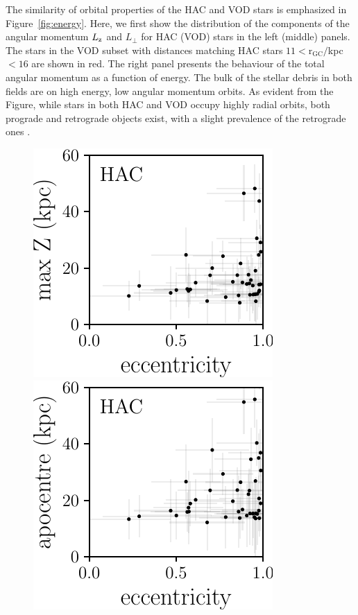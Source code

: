 \documentclass[fleqn,usenatbib]{mnras}
\begin{document}
The similarity of orbital properties of the HAC and VOD stars is
emphasized in Figure~\ref{fig:energy}. Here, we first show the
distribution of the components of the angular momentum $L_{\rm z}$ and
$L_{\perp}$ for HAC (VOD) stars in the left (middle) panels. The stars in the 
VOD subset with distances matching HAC stars $11\mathrm{<r_{GC}}/$kpc$<16$ are shown in red. The
right panel presents the behaviour of the total angular momentum as a
function of energy. The bulk of the stellar debris in both fields are
on high energy, low angular momentum orbits. As evident from the
Figure, while stars in both HAC and VOD occupy highly radial orbits,
both prograde and retrograde objects exist, with a slight prevalence
of the retrograde ones \citep[see
  also][]{actionhalo,shards,Helmi2018}.
%
\begin{figure}
	\includegraphics[scale=0.473]{HAC_orbits_ecc_z.pdf}
    \includegraphics[scale=0.473]{HAC_orbits_apo_ecc.pdf} 

\end{figure}
\end{document}
